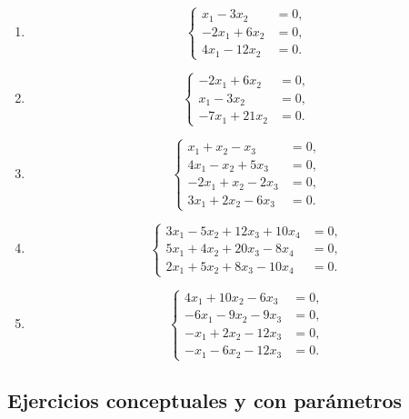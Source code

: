\documentclass[12pt]{article}
\newcommand{\sistema}[1]{%
\[
\left\{
\begin{aligned}
#1
\end{aligned}
\right.
\]
}
\begin{document}
\begin{enumerate}[label=\textbf{H\arabic*.},leftmargin=*]
\item \sistema{x_1-3x_2&=0,\\-2x_1+6x_2&=0,\\4x_1-12x_2&=0.}
\item \sistema{-2x_1+6x_2&=0,\\x_1-3x_2&=0,\\-7x_1+21x_2&=0.}
\item \sistema{x_1+x_2-x_3&=0,\\4x_1-x_2+5x_3&=0,\\-2x_1+x_2-2x_3&=0,\\3x_1+2x_2-6x_3&=0.}
\item \sistema{3x_1-5x_2+12x_3+10x_4&=0,\\5x_1+4x_2+20x_3-8x_4&=0,\\2x_1+5x_2+8x_3-10x_4&=0.}
\item \sistema{4x_1+10x_2-6x_3&=0,\\-6x_1-9x_2-9x_3&=0,\\-x_1+2x_2-12x_3&=0,\\-x_1-6x_2-12x_3&=0.}
\end{enumerate}

\subsection*{Ejercicios conceptuales y con parámetros}
\end{document}
